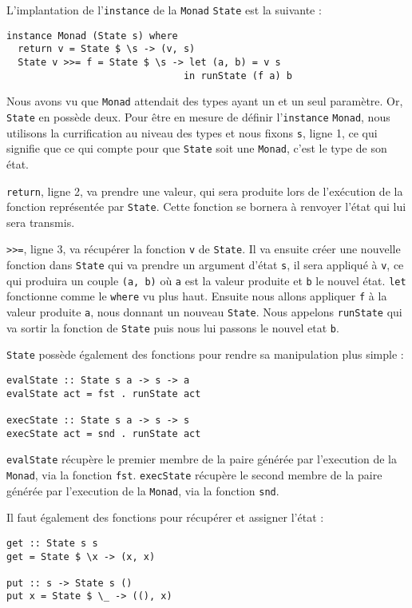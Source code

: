 \documentclass{llncs}
\begin{document}
L'implantation de l'\lstinline{instance} de la \lstinline{Monad} \lstinline{State}
est la suivante :
\begin{lstlisting}
instance Monad (State s) where
  return v = State $ \s -> (v, s)
  State v >>= f = State $ \s -> let (a, b) = v s
                               in runState (f a) b
\end{lstlisting}

Nous avons vu que \lstinline{Monad} attendait des types ayant un et un seul paramètre.
Or, \lstinline{State} en possède deux.
Pour être en mesure de définir l'\lstinline{instance} \lstinline{Monad},
nous utilisons la currification au niveau des types et nous fixons \lstinline{s},
ligne 1, ce qui signifie que ce qui compte pour que \lstinline{State} soit une \lstinline{Monad},
c'est le type de son état.

\lstinline{return}, ligne 2, va prendre une valeur, qui sera produite lors de
l'exécution de la fonction représentée par \lstinline{State}.
Cette fonction se bornera à renvoyer l'état qui lui sera transmis.

\lstinline{>>=}, ligne 3, va récupérer la fonction \lstinline{v} de \lstinline{State}.
Il va ensuite créer une nouvelle fonction dans \lstinline{State} qui va prendre
un argument d'état \lstinline{s}, il sera appliqué à \lstinline{v}, ce qui
produira un couple \lstinline{(a, b)} où \lstinline{a} est la valeur produite
et  \lstinline{b} le nouvel état.
\lstinline{let} fonctionne comme le \lstinline{where} vu plus haut.
Ensuite nous allons appliquer \lstinline{f} à la valeur produite \lstinline{a},
nous donnant un nouveau \lstinline{State}.
Nous appelons \lstinline{runState} qui va sortir la fonction de \lstinline{State}
puis nous lui passons le nouvel etat \lstinline{b}.

\lstinline{State} possède également des fonctions pour rendre sa manipulation
plus simple :
\begin{lstlisting}
evalState :: State s a -> s -> a
evalState act = fst . runState act

execState :: State s a -> s -> s
execState act = snd . runState act
\end{lstlisting}
\lstinline{evalState} récupère le premier membre de la paire générée par l'execution
de la \lstinline{Monad}, via la fonction \lstinline{fst}.
\lstinline{execState} récupère le second membre de la paire générée par l'execution
de la \lstinline{Monad}, via la fonction \lstinline{snd}.

Il faut également des fonctions pour récupérer et assigner l'état :
\begin{lstlisting}
get :: State s s
get = State $ \x -> (x, x)

put :: s -> State s ()
put x = State $ \_ -> ((), x)
\end{lstlisting}
\end{document}
